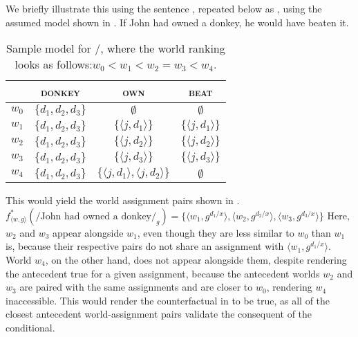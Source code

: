We briefly illustrate this using the sentence , repeated below as , using the assumed model shown in  \parencite[due][]{Walker2015}.
\ex
If John had owned a donkey, he would have beaten it.
\xe
\begin{table}[!htb]
\caption{Sample model for /, where the world ranking looks as follows:\linebreak $w_0<w_1<w_2=w_3<w_4$.}
    \begin{tabular}{lccc}\toprule
            & {\scshape donkey} & {\scshape own} & {\scshape beat}\\\midrule
            $w_0$ & $\{d_1,d_2,d_3\}$ & $\emptyset$ & $\emptyset$\\
            $w_1$ & $\{d_1,d_2,d_3\}$ & $\{\langle j,d_1\rangle\}$ & $\{\langle j,d_1\rangle\}$\\
            $w_2$ & $\{d_1,d_2,d_3\}$ & $\{\langle j,d_2\rangle\}$ & $\{\langle j,d_2\rangle\}$\\
            $w_3$ & $\{d_1,d_2,d_3\}$ & $\{\langle j,d_3\rangle\}$ & $\{\langle j,d_3\rangle\}$\\
            $w_4$ & $\{d_1,d_2,d_3\}$ & $\{\langle j,d_1\rangle,\langle j,d_2\rangle\}$ & $\emptyset$\\
          \bottomrule
    \end{tabular}
\end{table}
This would yield the world assignment pairs shown in .
\ex
$f^*_{\langle w,g\rangle}(/\text{John had owned a donkey}/_g)=\{\langle w_1,g^{d_1/x}\rangle,\langle w_2,g^{d_2/x}\rangle,\langle w_3,g^{d_3/x}\rangle\}$
\xe
Here, $w_2$ and $w_3$ appear alongside $w_1$, even though they are less similar to $w_0$ than $w_1$ is, because their respective pairs do not share an assignment with $\langle w_1,g^{d_1/x}\rangle$. World $w_4$, on the other hand, does not appear alongside them, despite rendering the antecedent true for a given assignment, because the antecedent worlds $w_2$ and $w_3$ are paired with the same assignments and are closer to $w_0$, rendering $w_4$ inaccessible. This would render the counterfactual in  to be true, as all of the closest antecedent world-assignment pairs validate the consequent of the conditional.


